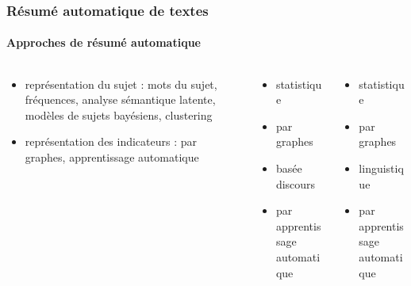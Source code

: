 \documentclass[xcolor=table]{beamer}
\begin{document}
\begin{frame}
\frametitle{Résumé automatique de textes}
\framesubtitle{Approches de résumé automatique}

\begin{columns}
\begin{column}{0.32\textwidth}
	\begin{block}{\scriptsize\bfseries\cite{12-nenkova-mckeown}}
		\begin{itemize}
			\item représentation du sujet 
			:
			mots du sujet,
			fréquences, 
			analyse sémantique latente, 
			modèles de sujets bayésiens,
			clustering
			\item représentation des indicateurs : 
			par graphes, 
			apprentissage automatique
		\end{itemize}
	\end{block}
\end{column}
\begin{column}{0.3\textwidth}
	\begin{block}{\scriptsize\bfseries\cite{12-lloret-palomar}}
		\begin{itemize}
			\item statistique 
			\item par graphes
			\item basée discours
			\item par apprentissage automatique
		\end{itemize}
	\end{block}
\end{column}
\begin{column}{0.28\textwidth}
	\begin{block}{\scriptsize\bfseries\cite{19-aries-al}}
		\begin{itemize}
			\item statistique 
			\item par graphes
			\item linguistique 
			\item par apprentissage automatique
		\end{itemize}
	\end{block}
\end{column}
\end{columns}
	
\end{frame}
\end{document}
